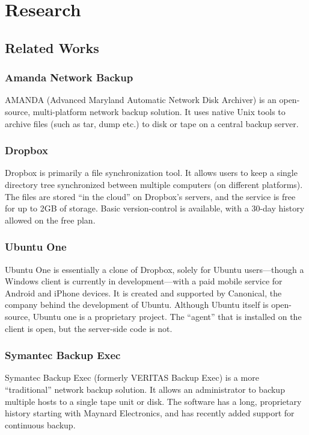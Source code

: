 \section{Research}

\subsection{Related Works}

\subsubsection{Amanda Network Backup}

AMANDA (Advanced Maryland Automatic Network Disk Archiver) is an open-source,
multi-platform network backup solution. It uses native Unix tools to archive
files (such as tar, dump etc.) to disk or tape on a central backup server.

\subsubsection{Dropbox}

Dropbox is primarily a file synchronization tool. It allows users to keep
a single directory tree synchronized between multiple computers (on different
platforms). The files are stored ``in the cloud'' on Dropbox's servers, and the
service is free for up to 2GB of storage. Basic version-control is available,
with a 30-day history allowed on the free plan.

\subsubsection{Ubuntu One}

Ubuntu One is essentially a clone of Dropbox, solely for Ubuntu users---though
a Windows client is currently in development---with a paid mobile service for
Android and iPhone devices. It is created and supported by Canonical, the
company behind the development of Ubuntu. Although Ubuntu itself is
open-source, Ubuntu one is a proprietary project. The ``agent'' that is
installed on the client is open, but the server-side code is not.

\subsubsection{Symantec Backup Exec}

Symantec Backup Exec (formerly VERITAS Backup Exec) is a more ``traditional''
network backup solution. It allows an administrator to backup multiple hosts to
a single tape unit or disk. The software has a long, proprietary history
starting with Maynard Electronics, and has recently added support for
continuous backup.

